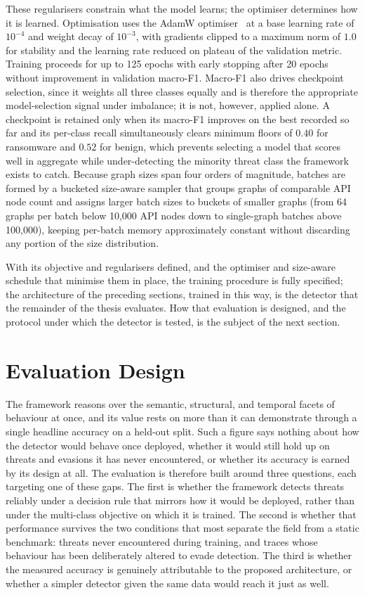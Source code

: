 \documentclass[%
    BCOR=10mm,
    DIV=13,
    toc=bibliography,
    toc=listof,
    oneside,
    12pt,
]{scrbook}
\begin{document}
These regularisers constrain what the model learns; the optimiser determines
how it is learned. Optimisation uses the AdamW
optimiser~\cite{loshchilov2019adamw} at a base learning rate of $10^{-4}$ and
weight decay of $10^{-3}$, with gradients clipped to a maximum norm of $1.0$
for stability and the learning rate reduced on plateau of the validation
metric. Training proceeds for up to 125 epochs with early stopping after 20
epochs without improvement in validation macro-F1. Macro-F1 also drives
checkpoint selection, since it weights all three classes equally and is
therefore the appropriate model-selection signal under imbalance; it is not,
however, applied alone. A checkpoint is retained only when its macro-F1
improves on the best recorded so far and its per-class recall simultaneously
clears minimum floors of $0.40$ for ransomware and $0.52$ for benign, which
prevents selecting a model that scores well in aggregate while
under-detecting the minority threat class the framework exists to catch. Because
graph sizes span four orders of magnitude, batches are formed by a bucketed
size-aware sampler that groups graphs of comparable API node count and assigns
larger batch sizes to buckets of smaller graphs (from 64 graphs per batch
below 10{,}000 API nodes down to single-graph batches above 100{,}000),
keeping per-batch memory approximately constant without discarding any portion
of the size distribution.

With its objective and regularisers defined, and the optimiser and size-aware
schedule that minimise them in place, the training procedure is fully specified;
the architecture of the preceding sections, trained in this way, is the detector
that the remainder of the thesis evaluates. How that evaluation is designed, and
the protocol under which the detector is tested, is the subject of the next
section.

\section{Evaluation Design}
\label{sec:evaluation}

The framework reasons over the semantic, structural, and temporal facets of
behaviour at once, and its value rests on more than it can demonstrate through a
single headline accuracy on a held-out split. Such a figure says nothing about
how the detector would behave once deployed, whether it would still hold up on
threats and evasions it has never encountered, or whether its accuracy is earned
by its design at all. The evaluation is therefore built around three questions,
each targeting one of these gaps. The first is whether the framework detects
threats reliably under a decision rule that mirrors how it would be deployed,
rather than under the multi-class objective on which it is trained. The second
is whether that performance survives the two conditions that most separate the
field from a static benchmark: threats never encountered during training, and
traces whose behaviour has been deliberately altered to evade
detection. The third is whether the measured accuracy is genuinely attributable
to the proposed architecture, or whether a simpler detector given the same data
would reach it just as well.
\end{document}
